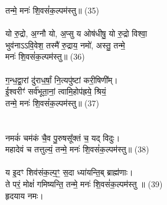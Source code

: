 तन्मे॒ मनः॑ शि॒वसं॑क॒ल्पम॑स्तु॥ (35)\\
\\
यो रु॒द्रो, अ॒ग्नौ यो, अ॒प्सु य ओष॑धीषु॒ यो रु॒द्रो विश्वा॒ \\
भुव॑नाऽऽवि॒वेश॒ तस्मै॑ रु॒द्राय॒ नमो॑, अस्तु॒ तन्मे॒ \\
मनः॑ शि॒वसं॑क॒ल्पम॑स्तु॥ (36)\\
\\
ग॒न्ध॒द्वा॒रां दु॑राध॒र्षां॒ नि॒त्यपु॑ष्टां करी॒षिणी᳚म्। \\
ई॒श्वरीꣳ॑ सर्व॑भूता॒नां॒ त्वामि॒होप॑ह्रये॒ श्रियं॒  \\
तन्मे॒ मनः॑ शि॒वसं॑क॒ल्पम॑स्तु॥ (37)\\
\\
{\small {}}\\
नमकं॑ चम॑कं चै॒व पु॒रुषसू᳚क्तं च॒ यद् विदुः। \\
महादेवं च तत्तुल्यं॒ तन्मे॒ मनः॑ शि॒वसं॑क॒ल्पम॑स्तु॥ (38)\\
\\
य इ॒दꣳ शिव॑संक॒ल्प॒ꣳ॒ स॒दा ध्या॑यन्ति॒ब् ब्राह्म॑णाः। \\
ते परं॒ मोक्षं॑ गमिष्यन्ति॒ तन्मे॒ मनः॑ शि॒वसं॑क॒ल्पम॑स्तु ॥ (39)\\
हृदयाय नमः।\\
